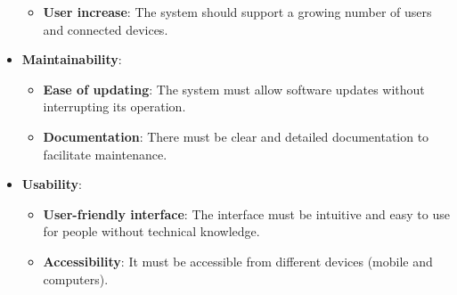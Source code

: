 \begin{itemize}
\begin{itemize}
            \item \textbf{User increase}: The system should support a growing number of users and connected devices. 
        \end{itemize}
    \item \textbf{Maintainability}:
        \begin{itemize}
            \item \textbf{Ease of updating}: The system must allow software updates without interrupting its operation.
            \item \textbf{Documentation}: There must be clear and detailed documentation to facilitate maintenance.
        \end{itemize}
    \item \textbf{Usability}:
        \begin{itemize}
            \item \textbf{User-friendly interface}: The interface must be intuitive and easy to use for people without technical knowledge.
            \item \textbf{Accessibility}: It must be accessible from different devices (mobile and computers).
        \end{itemize}
\end{itemize}